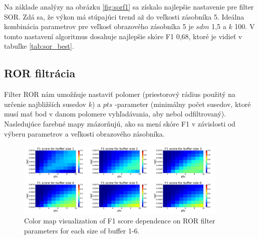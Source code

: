 Na základe analýzy na obrázku \ref{fig:sorf1} sa získalo najlepšie nastavenie pre filter SOR. Zdá sa, že výkon má stúpajúci trend až do veľkosti zásobníka 5. Ideálna kombinácia parametrov pre veľkosť obrazového zásobníka 5 je $sdm$ 1,5 a $k$ 100. V tomto nastavení algoritmus dosahuje najlepšie skóre F1 0,68, ktoré je vidieť v tabuľke \ref{tab:sor_best}.

\subsection{ROR filtrácia}

Filter ROR nám umožňuje nastaviť polomer (priestorový rádius použitý na určenie najbližších susedov $k$) a  $pts$ -parameter (minimálny počet susedov, ktoré musí mať bod v danom polomere vyhľadávania, aby nebol  odfiltrovaný). Nasledujúce farebné mapy znázorňujú, ako sa mení skóre F1 v závislosti od výberu parametrov a veľkosti obrazového zásobníka.

\begin{figure}[H]
	\centering
	\includegraphics[width=0.9\textwidth]{figures/ror_f1.png}
	\caption{Color map visualization of F1 score dependence on ROR filter parameters for each size of buffer 1-6.}
	\label{fig:rorf1}
\end{figure}

